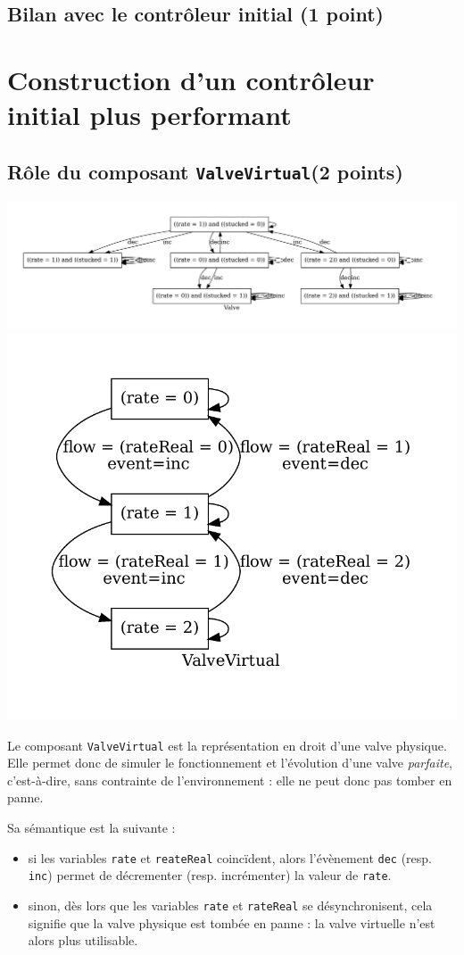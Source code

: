 \documentclass[a4paper]{book}
\begin{document}
\subsection{Bilan avec le contrôleur initial (1 point)}

\section{Construction d'un contrôleur initial plus performant}
\subsection{Rôle du composant {\tt ValveVirtual}(2 points)}
\includegraphics[height=.2\textheight,width=.5\textwidth]{Graphs/Valve-modes.pdf}
\includegraphics[height=.2\textheight,width=.5\textwidth]{Graphs/ValveVirtual-modes.pdf}

Le composant \texttt{ValveVirtual} est la représentation en droit d'une valve
physique. Elle permet donc de simuler le fonctionnement et l'évolution d'une
valve \textit{parfaite}, c'est-à-dire, sans contrainte de l'environnement :
elle ne peut donc pas tomber en panne.

Sa sémantique est la suivante :
\begin{itemize}
  \item si les variables \texttt{rate} et \texttt{reateReal} coincïdent, alors l'évènement \texttt{dec} (resp. \texttt{inc})
    permet de décrementer (resp. incrémenter) la valeur de \texttt{rate}.
  \item sinon, dès lors que les variables \texttt{rate} et \texttt{rateReal} se
    désynchronisent, cela signifie que la valve physique est tombée en panne : la valve virtuelle
    n'est alors plus utilisable.
\end{itemize}
\end{document}
